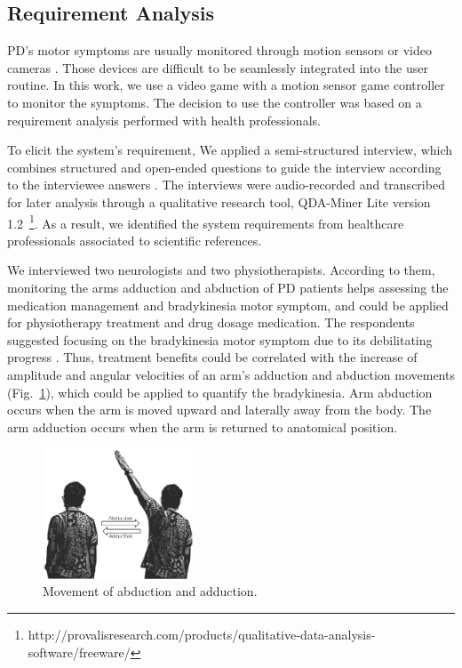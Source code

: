 \documentclass[10pt, conference, compsocconf]{IEEEtran}
\begin{document}
\subsection{Requirement Analysis}

PD's motor symptoms are usually monitored through motion sensors or video cameras  \cite{cbmshandwriting2015}. Those devices are difficult to be seamlessly integrated into the user routine. In this work, we use a video game with a motion sensor game controller to monitor the symptoms. The decision to use the controller was based on a requirement analysis performed with health professionals. 

To elicit the system's requirement, We applied a semi-structured interview, which combines structured and open-ended questions to guide the interview according to the interviewee answers \cite{practical_guide_re2012}. The interviews were audio-recorded and transcribed for later analysis through a qualitative research tool, QDA-Miner Lite version 1.2~\footnote{http://provalisresearch.com/products/qualitative-data-analysis-software/freeware/}.  As a result, we identified the system requirements from healthcare professionals associated to scientific references.

We interviewed two neurologists and two physiotherapists. According to them, monitoring the arms adduction and abduction of PD patients helps assessing the medication management and bradykinesia motor symptom, and could be applied for physiotherapy treatment and drug dosage medication. The respondents suggested focusing on the bradykinesia motor symptom due to its debilitating progress \cite{national2006parkinson,ambulatory2010}. Thus, treatment benefits could be correlated with the increase of amplitude and angular velocities of an arm's adduction and abduction movements (Fig.~\ref{fig:abduction}), which could be applied to quantify the bradykinesia. Arm abduction occurs when the arm is moved upward and laterally away from the body. The arm adduction occurs when the arm is returned to anatomical position. 


\begin{figure}[!htb]
  \centering
  \includegraphics[width=0.4\textwidth]{./img/movaddcutctionartist.png}
  \caption{Movement of abduction and adduction.}
  \label{fig:abduction}
\end{figure}
\end{document}
